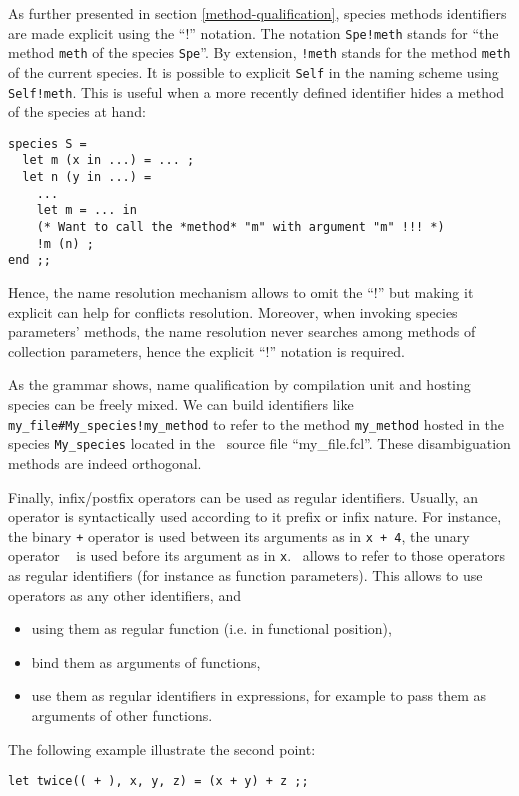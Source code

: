 \medskip {} As further presented in section
\ref{method-qualification}, species methods identifiers are made
explicit using the ``!'' notation. The notation {\tt Spe!meth} stands
for ``the method {\tt meth} of the species {\tt Spe}''. By extension,
{\tt !meth} stands for the method {\tt meth} of the current
species. It is possible to explicit {\tt Self} in the naming scheme
using {\tt Self!meth}. This is useful when a more recently defined
identifier hides a method of the species at hand: {\scriptsize
\begin{lstlisting}
species S =
  let m (x in ...) = ... ;
  let n (y in ...) =
    ...
    let m = ... in
    (* Want to call the *method* "m" with argument "m" !!! *)
    !m (n) ;
end ;;
\end{lstlisting}
}

Hence, the name resolution mechanism allows to omit the ``!'' but
making it explicit can help for conflicts resolution. Moreover, when
invoking species parameters' methods, the name resolution never
searches among methods of collection parameters, hence the explicit ``!''
notation is required.

As the grammar shows, name qualification by compilation unit and
hosting species can be freely mixed. We can build identifiers like
{\tt my\_file\#My\_species!my\_method} to refer to the method
{\tt my\_method} hosted in the species {\tt My\_species} located in
the \focal\ source file ``my\_file.fcl''. These disambiguation
methods are indeed orthogonal.



\medskip
{}

Finally, infix/postfix operators can be used as regular
identifiers. Usually, an operator is syntactically used according to
it prefix or infix nature. For instance, the binary {\tt +} operator
is used between its arguments as in {\tt x + 4}, the unary operator {\tt
  \tilde} is used before its argument as in {\tt \tilde x}. \focal\ allows to
refer to those operators as regular identifiers (for instance as function
parameters).
This allows to use operators as any other identifiers, and
\begin{itemize}
  \item using them as regular function (i.e. in functional position),
  \item bind them as arguments of functions,
  \item use them as regular identifiers in expressions, for example to
    pass them as arguments of other functions.
\end{itemize}
The following example illustrate the second point:
\begin{lstlisting}
let twice(( + ), x, y, z) = (x + y) + z ;;
\end{lstlisting}


